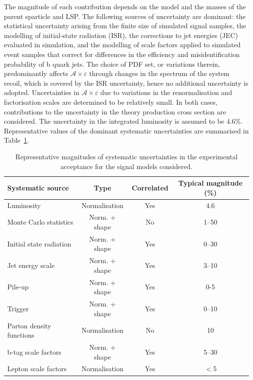 The magnitude of each contribution depends on the model and the masses
of the parent sparticle and LSP. The following sources of uncertainty
are dominant: the statistical uncertainty arising from the finite size
of simulated signal samples, the modelling of initial-state radiation
(ISR), the corrections to jet energies (JEC) evaluated in simulation,
and the modelling of scale factors applied to simulated event samples
that correct for differences in the efficiency and misidentification
probability of b quark jets. The choice of PDF set, or variations
therein, predominantly affects $\mathcal{A}\times\varepsilon$ through
changes in the \Pt spectrum of the system recoil, which is covered by
the ISR uncertainty, hence no additional uncertainty is
adopted. Uncertainties in $\mathcal{A}\times\varepsilon$ due to
variations in the renormalisation and factorisation scales are
determined to be relatively small. In both cases, contributions to the
uncertainty in the theory production cross section are considered. The
uncertainty in the integrated luminosity is assumed to be
4.6\%. Representative values of the dominant systematic uncertainties
are summarised in Table~\ref{tab:signal_systs}.

\begin{table}[h!]
  \caption{
    Representative magnitudes of systematic uncertainties in the
    experimental acceptance for the signal models considered. 
  }
  \label{tab:signal_systs}
  \centering
  \footnotesize
  \begin{tabular}{ lccc }
    \hline
    \hline
    Systematic source              & Type          & Correlated & Typical magnitude (\%) \\
    \hline
    Luminosity                     & Normalisation & Yes        & 4.6                    \\
    Monte Carlo statistics         & Norm. + shape & No         & 1--50                  \\
    Initial state radiation        & Norm. + shape & Yes        & 0--30                  \\
    Jet energy scale               & Norm. + shape & Yes        & 3--10                  \\
    Pile-up                        & Norm. + shape & Yes        & 0-5                    \\
    Trigger                        & Norm. + shape & Yes        & 0--10                  \\
    Parton density functions       & Normalisation & No         & 10                     \\
    b-tag scale factors            & Norm. + shape & Yes        & 5--30                  \\
    Lepton scale factors           & Normalisation & Yes        & $<$5                   \\
    \hline
    \hline
  \end{tabular}
\end{table}
  
